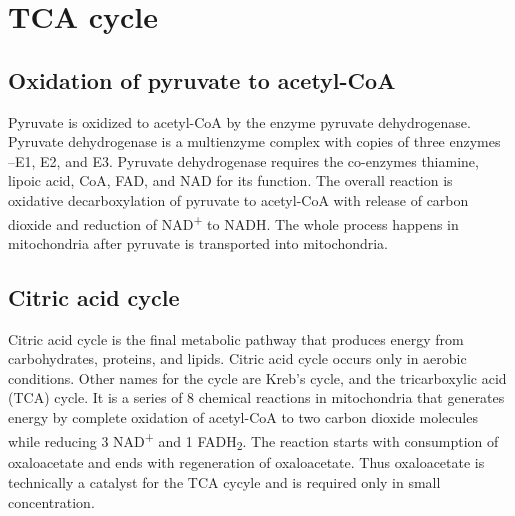 \documentclass[
]{book}
\begin{document}
\chapter{TCA cycle}\label{tca-cycle}

\section{Oxidation of pyruvate to acetyl-CoA}\label{oxidation-of-pyruvate-to-acetyl-coa}

Pyruvate is oxidized to acetyl-CoA by the enzyme pyruvate dehydrogenase. Pyruvate dehydrogenase is a multienzyme complex with copies of three enzymes --E1, E2, and E3. Pyruvate dehydrogenase requires the co-enzymes thiamine, lipoic acid, CoA, FAD, and NAD for its function. The overall reaction is oxidative decarboxylation of pyruvate to acetyl-CoA with release of carbon dioxide and reduction of NAD\textsuperscript{+} to NADH. The whole process happens in mitochondria after pyruvate is transported into mitochondria.

\section{Citric acid cycle}\label{citric-acid-cycle}

Citric acid cycle is the final metabolic pathway that produces energy from carbohydrates, proteins, and lipids. Citric acid cycle occurs only in aerobic conditions. Other names for the cycle are Kreb's cycle, and the tricarboxylic acid (TCA) cycle. It is a series of 8 chemical reactions in mitochondria that generates energy by complete oxidation of acetyl-CoA to two carbon dioxide molecules while reducing 3 NAD\textsuperscript{+} and 1 FADH\textsubscript{2}. The reaction starts with consumption of oxaloacetate and ends with regeneration of oxaloacetate. Thus oxaloacetate is technically a catalyst for the TCA cycyle and is required only in small concentration.
\end{document}
